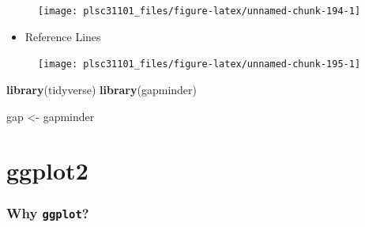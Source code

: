 \documentclass[
]{book}
\newenvironment{Shaded}{\begin{snugshade}}{\end{snugshade}}
\newcommand{\CommentTok}[1]{\textcolor[rgb]{0.56,0.35,0.01}{\textit{#1}}}
\newcommand{\DataTypeTok}[1]{\textcolor[rgb]{0.13,0.29,0.53}{#1}}
\newcommand{\DecValTok}[1]{\textcolor[rgb]{0.00,0.00,0.81}{#1}}
\newcommand{\KeywordTok}[1]{\textcolor[rgb]{0.13,0.29,0.53}{\textbf{#1}}}
\newcommand{\NormalTok}[1]{#1}
\newcommand{\OperatorTok}[1]{\textcolor[rgb]{0.81,0.36,0.00}{\textbf{#1}}}
\newcommand{\StringTok}[1]{\textcolor[rgb]{0.31,0.60,0.02}{#1}}
\providecommand{\tightlist}{%
  \setlength{\itemsep}{0pt}\setlength{\parskip}{0pt}}
\begin{document}
\begin{figure}

{\centering \texttt{[image: plsc31101\_files/figure-latex/unnamed-chunk-194-1]} 

}

\caption{ }\label{fig:unnamed-chunk-194}
\end{figure}

\begin{itemize}
\tightlist
\item
  Reference Lines
\end{itemize}

\begin{Shaded}
\end{Shaded}

\begin{figure}

{\centering \texttt{[image: plsc31101\_files/figure-latex/unnamed-chunk-195-1]} 

}

\caption{ }\label{fig:unnamed-chunk-195}
\end{figure}

\begin{Shaded}
\begin{Highlighting}[]
\KeywordTok{library}\NormalTok{(tidyverse)}
\KeywordTok{library}\NormalTok{(gapminder)}

\NormalTok{gap <-}\StringTok{ }\NormalTok{gapminder}
\end{Highlighting}
\end{Shaded}

\hypertarget{ggplot2}{%
\section{ggplot2}\label{ggplot2}}

\hypertarget{why-ggplot}{%
\subsubsection*{\texorpdfstring{Why \texttt{ggplot}?}{Why ggplot?}}\label{why-ggplot}}
\end{document}
